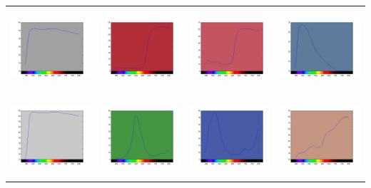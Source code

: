 \documentclass{amsart}
\theoremstyle{definition}
\theoremstyle{remark}
\numberwithin{equation}{section}
\begin{document}
\begin{tabular}{  c c c c }
\includegraphics[width=3.0cm,height=3.0cm]{images/ch13.jpg}
&
\includegraphics[width=3.0cm,height=3.0cm]{images/ch14.jpg}
&
\includegraphics[width=3.0cm,height=3.0cm]{images/ch15.jpg}
&
\includegraphics[width=3.0cm,height=3.0cm]{images/ch16.jpg}
\\

\includegraphics[width=3.0cm,height=3.0cm]{images/ch17.jpg}
&
\includegraphics[width=3.0cm,height=3.0cm]{images/ch18.jpg}
&
\includegraphics[width=3.0cm,height=3.0cm]{images/ch19.jpg}
&
\includegraphics[width=3.0cm,height=3.0cm]{images/ch20.jpg}
\\


\end{tabular}
\end{document}

